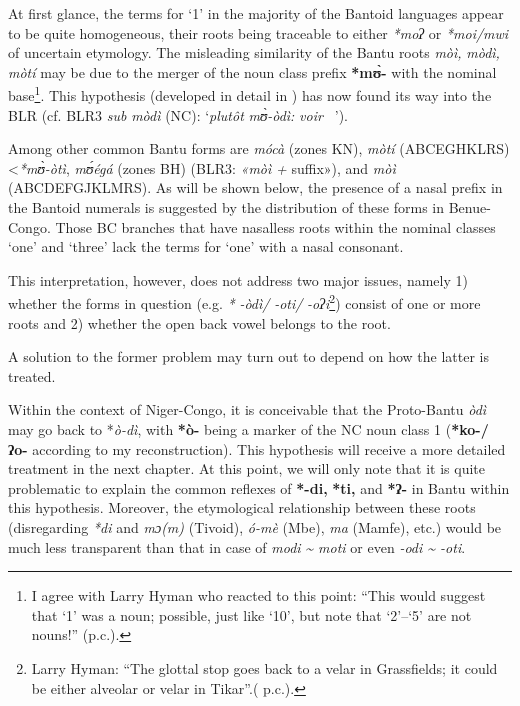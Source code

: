 At first glance, the terms for `1' in the majority of the Bantoid languages appear to be quite homogeneous, their roots being traceable to either \textit{*moʔ} or \textit{*moi/mwi} of uncertain etymology. The misleading similarity of the Bantu roots \textit{mòì,} \textit{mòdì,} \textit{mòtí} may be due to the merger of the noun class prefix \textbf{*m{\`{ʊ}}-} with the nominal base\footnote{I agree with Larry Hyman who reacted to this point: “This would suggest that ‘1’ was a noun; possible, just like ‘10’, but note that `2'--`5' are not nouns!” (p.c.).}. This hypothesis (developed in detail in \citealt{Vanhoudt1994}) has now found its way into the BLR (cf. BLR3 \textit{sub} \textit{mòdì} (NC): ‘\textit{plutôt} \textit{m{\`{ʊ}}-òdì:} \textit{voir} \textit{\citealt{Vanhoudt1994}~}’). 

Among other common Bantu forms are \textit{mócà} (zones KN), \textit{mòtí} (ABCEGHKLRS) <\textit{*m{\`{ʊ}}-òtì}, \textit{m{\'{ʊ}}égá} (zones BH) (BLR3: \textit{«mòì} \textit{+}  {suffix»}), and \textit{mòì} (ABCDEFGJKLMRS). As will be shown below, the presence of a nasal prefix in the Bantoid numerals is suggested by the distribution of these forms in Benue-Congo. Those BC branches that have nasalless roots within the nominal classes ‘one’ and ‘three’ lack the terms for ‘one’ with a nasal consonant. 

This interpretation, however, does not address two major issues, namely 1) whether the forms in question (e.g. \textit{*} \textit{-òdì/} \textit{-oti/} \textit{-oʔi}\footnote{Larry Hyman: “The glottal stop goes back to a velar in Grassfields; it could be either alveolar or velar in Tikar”.( p.c.).}) consist of one or more roots and 2) whether the open back vowel belongs to the root. 

A solution to the former problem may turn out to depend on how the latter is treated.

Within the context of Niger-Congo, it is conceivable that the Proto-Bantu \textit{òdì} may go back to *\textit{ò-dì}, with \textbf{*ò-} being a marker of the NC noun class 1 (\textbf{*ko-/} \textbf{ʔo-} according to my reconstruction). This hypothesis will receive a more detailed treatment in the next chapter. At this point, we will only note that it is quite problematic to explain the common reflexes of \textbf{*-di,} \textbf{*ti,} and \textbf{*ʔ-} in Bantu within this hypothesis. Moreover, the etymological relationship between these roots (disregarding \textit{*di} and \textit{mɔ(m)} (Tivoid), \textit{ó-mè} (Mbe), \textit{ma} (Mamfe), etc.) would be much less transparent than that in case of \textit{modi} \textit{{\textasciitilde} moti} or even \textit{-odi {\textasciitilde} -oti}.

